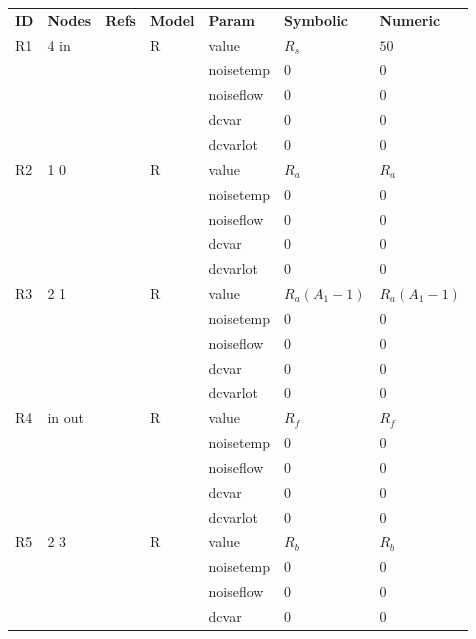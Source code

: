 \begin{table}[h]
\centering
\begin{tabular}[c]{lllllll}
\textbf{ID} & \textbf{Nodes} & \textbf{Refs} & \textbf{Model} & \textbf{Param} & \textbf{Symbolic} & \textbf{Numeric} \\ 
\rowcolor{myyellow}
\small{R1} &\small{4 in } & &\small{R} &\small{value} &$R_{s}$ &$50$ \\ 
 & & & &\small{noisetemp} &$0$ &$0$ \\ 
\rowcolor{myyellow}
 & & & &\small{noiseflow} &$0$ &$0$ \\ 
 & & & &\small{dcvar} &$0$ &$0$ \\ 
\rowcolor{myyellow}
 & & & &\small{dcvarlot} &$0$ &$0$ \\ 
\small{R2} &\small{1 0 } & &\small{R} &\small{value} &$R_{a}$ &$R_{a}$ \\ 
\rowcolor{myyellow}
 & & & &\small{noisetemp} &$0$ &$0$ \\ 
 & & & &\small{noiseflow} &$0$ &$0$ \\ 
\rowcolor{myyellow}
 & & & &\small{dcvar} &$0$ &$0$ \\ 
 & & & &\small{dcvarlot} &$0$ &$0$ \\ 
\rowcolor{myyellow}
\small{R3} &\small{2 1 } & &\small{R} &\small{value} &$R_{a} \left(A_{1} - 1\right)$ &$R_{a} \left(A_{1} - 1\right)$ \\ 
 & & & &\small{noisetemp} &$0$ &$0$ \\ 
\rowcolor{myyellow}
 & & & &\small{noiseflow} &$0$ &$0$ \\ 
 & & & &\small{dcvar} &$0$ &$0$ \\ 
\rowcolor{myyellow}
 & & & &\small{dcvarlot} &$0$ &$0$ \\ 
\small{R4} &\small{in out } & &\small{R} &\small{value} &$R_{f}$ &$R_{f}$ \\ 
\rowcolor{myyellow}
 & & & &\small{noisetemp} &$0$ &$0$ \\ 
 & & & &\small{noiseflow} &$0$ &$0$ \\ 
\rowcolor{myyellow}
 & & & &\small{dcvar} &$0$ &$0$ \\ 
 & & & &\small{dcvarlot} &$0$ &$0$ \\ 
\rowcolor{myyellow}
\small{R5} &\small{2 3 } & &\small{R} &\small{value} &$R_{b}$ &$R_{b}$ \\ 
 & & & &\small{noisetemp} &$0$ &$0$ \\ 
\rowcolor{myyellow}
 & & & &\small{noiseflow} &$0$ &$0$ \\ 
 & & & &\small{dcvar} &$0$ &$0$ \\ 

\end{tabular}
\end{table}

